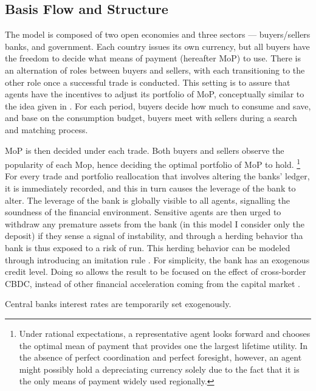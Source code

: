 \subsection{Basis Flow and Structure}

The model is composed of two open economies and three sectors --- buyers/sellers
banks, and government. Each country issues its own currency, but all buyers have
the freedom to decide what means of payment (hereafter MoP) to use.  There is
an alternation of roles between buyers and sellers, with each transitioning to
the other role once a successful trade is conducted. This setting is to assure
that agents have the incentives to adjust its portfolio of MoP, conceptually
similar to the idea given in \citet*{TW95}. For each period, buyers decide how
much to consume and save, and base on the consumption budget, buyers meet with
sellers during a search and matching process. 

MoP is then decided under each trade. Both buyers and sellers observe the
popularity of each Mop, hence deciding the optimal portfolio of MoP to hold.
\footnote{Under rational expectations, a representative agent looks forward and
chooses the optimal mean of payment that provides one the largest lifetime
utility. In the absence of perfect coordination and perfect foresight, however,
an agent might possibly hold a depreciating currency solely due to the fact that
it is the only means of payment widely used regionally.}
For every trade and portfolio reallocation that involves altering the banks'
ledger, it is immediately recorded, and this in turn causes the leverage of the
bank to alter. The leverage of the bank is globally visible to all agents,
signalling the soundness of the financial environment. Sensitive agents are then
urged to withdraw any premature assets from the bank (in this model I consider
only the deposit) if they sense a signal of instability, and through a herding
behavior tha bank is thus exposed to a risk of run. This herding behavior can be
modeled through introducing an imitation rule \citep*{Santos2021}. For
simplicity, the bank has an exogenous credit level. Doing so allows the result
to be focused on the effect of cross-border CBDC, instead of other financial
acceleration coming from the capital market \citep{BGG96}.  

Central banks interest rates are temporarily set exogenously.

